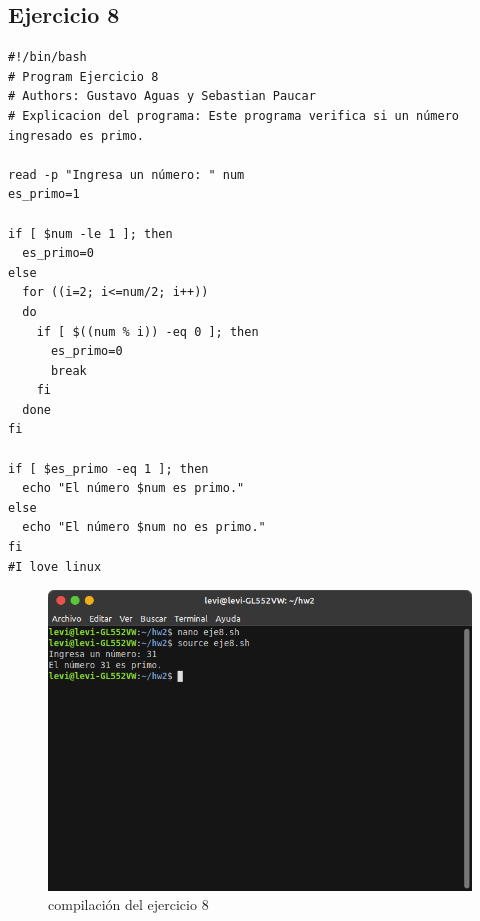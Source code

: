 \documentclass[11pt,twoside]{book}
\begin{document}
\subsection{Ejercicio 8}
\begin{lstlisting}
#!/bin/bash
# Program Ejercicio 8
# Authors: Gustavo Aguas y Sebastian Paucar
# Explicacion del programa: Este programa verifica si un número ingresado es primo.

read -p "Ingresa un número: " num
es_primo=1

if [ $num -le 1 ]; then
  es_primo=0
else
  for ((i=2; i<=num/2; i++))
  do
    if [ $((num % i)) -eq 0 ]; then
      es_primo=0
      break
    fi
  done
fi

if [ $es_primo -eq 1 ]; then
  echo "El número $num es primo."
else
  echo "El número $num no es primo."
fi
#I love linux
\end{lstlisting}
\begin{figure}[h]
    \centering
    \includegraphics[width=0.6\linewidth]{Tarea2/teje8.png}
    \caption{ compilación del ejercicio 8}
\end{figure}
\newpage
\end{document}

